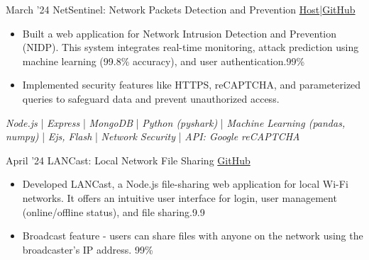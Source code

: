 \documentclass[9pt]{developercv} %
\begin{document}
\vspace{-20 pt}
\vspace{-4 pt}
\begin{entrylist}
\vspace{-4 pt}
    \entry
		{March '24}
		{NetSentinel: Network Packets Detection and Prevention}
		{\href{https://github.com/21Sandesh/NetSentinel-Network-Packets-Detection-and-Prevention.git}{Host}\hspace{0.15cm}|\hspace{0.15cm}\href{https://github.com/21Sandesh/NetSentinel-Network-Packets-Detection-and-Prevention.git}{GitHub}}
		{\vspace{-10pt}
        \begin{itemize}[noitemsep,topsep=0pt,parsep=0pt,partopsep=0pt, leftmargin=-1pt]
            \item {Built a web application for Network Intrusion Detection and Prevention (NIDP). This system integrates real-time monitoring, attack prediction using machine learning (99.8\% accuracy), and user authentication.{\color{white}99\%}}
            \item {Implemented security features like HTTPS, reCAPTCHA, and parameterized queries to safeguard data and prevent unauthorized access.}
        \end{itemize} \vspace{2 pt}
        {\textit{Node.js}} | {\textit{Express}} | {\textit{MongoDB}} | {\textit{Python (pyshark)}} | {\textit{Machine Learning (pandas, numpy)}} | {\textit{Ejs, Flash}} | {\textit{Network Security}} | {\textit{API: Google reCAPTCHA}}}
    \entry
		{April '24}
		{LANCast: Local Network File Sharing}
		{\href{https://github.com/21Sandesh/HTTP-Client-Server-Connection-using-TCP-IP}{GitHub}}
		{\vspace{-10pt}
        \begin{itemize}[noitemsep,topsep=0pt,parsep=0pt,partopsep=0pt, leftmargin=-1pt]
            \item {Developed LANCast, a Node.js file-sharing web application for local Wi-Fi networks. It offers an intuitive user interface for login, user management (online/offline status), and file sharing.{\color{white}9.9}}
            \item {Broadcast feature - users can share files with anyone on the network using the broadcaster's IP address. {\color{white}99\%}}

\end{itemize}}
\end{entrylist}
\end{document}
